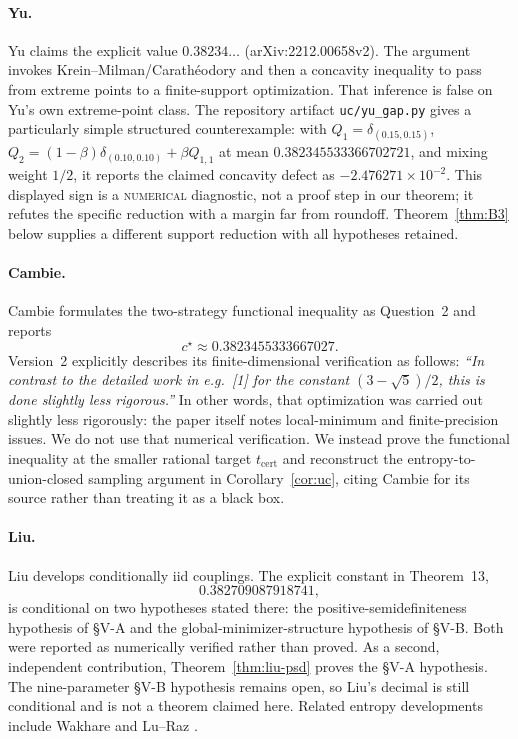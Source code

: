 \documentclass[11pt]{article}
\theoremstyle{plain}
\theoremstyle{definition}
\theoremstyle{remark}
\newcommand{\NUMERICAL}{\textsc{numerical}}
\begin{document}
\paragraph{Yu.}
Yu \cite[\S4]{yu} claims the explicit value
$0.38234\ldots$ (arXiv:2212.00658v2).  The argument invokes
Krein--Milman/Carath\'eodory and then a concavity inequality to pass from
extreme points to a finite-support optimization.  That inference is false on
Yu's own extreme-point class.  The repository artifact
\texttt{uc/yu\_gap.py} gives a particularly simple structured counterexample:
with $Q_1=\delta_{(0.15,0.15)}$,
$Q_2=(1-\beta)\delta_{(0.10,0.10)}+\beta Q_{1,1}$ at mean
$0.382345533366702721$, and mixing weight $1/2$, it reports the claimed
concavity defect as $-2.476271\times10^{-2}$.  This displayed sign is a
\NUMERICAL{} diagnostic, not a proof step in our theorem; it refutes the
specific reduction with a margin far from roundoff.  Theorem~\ref{thm:B3}
below supplies a different support reduction with all hypotheses retained.

\paragraph{Cambie.}
Cambie \cite{cambie} formulates the two-strategy functional inequality as
Question~2 and reports
\[
c^\star\approx0.3823455333667027.
\]
Version~2 explicitly describes its finite-dimensional verification as follows:
\emph{``In contrast to the detailed work in e.g.\ [1] for the constant
$(3-\sqrt5)/2$, this is done slightly less rigorous.''}
In other words, that optimization was carried out slightly less rigorously:
the paper itself notes local-minimum and finite-precision issues.  We do not
use that numerical verification.  We instead prove the functional inequality
at the smaller rational target \(t_{\mathrm{cert}}\) and reconstruct the
entropy-to-union-closed sampling argument in Corollary~\ref{cor:uc}, citing
Cambie for its source rather than treating it as a black box.

\paragraph{Liu.}
Liu \cite{liu} develops conditionally iid couplings.  The explicit constant in
Theorem~13,
\[
0.382709087918741,
\]
is conditional on two hypotheses stated there: the positive-semidefiniteness
hypothesis of \S V-A and the global-minimizer-structure hypothesis of
\S V-B.  Both were reported as numerically verified rather than proved.  As a
second, independent contribution, Theorem~\ref{thm:liu-psd} proves the
\S V-A hypothesis.  The nine-parameter \S V-B hypothesis remains open, so
Liu's decimal is still conditional and is not a theorem claimed here.
Related entropy developments include Wakhare \cite{wakhare} and
Lu--Raz \cite{luraz}.
\end{document}
